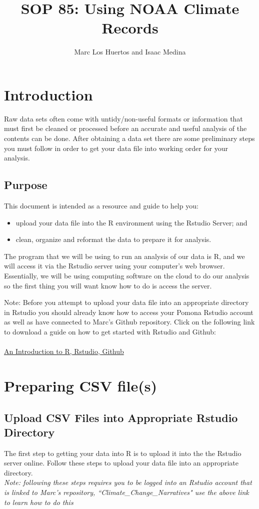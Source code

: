 \documentclass{article}\usepackage[]{graphicx}\usepackage[]{color}
\title{SOP 85: Using NOAA Climate Records}
\author{Marc Los Huertos and Isaac Medina}
\begin{document}
\maketitle

\section{Introduction}
Raw data sets often come with untidy/non-useful formats or information that must first be cleaned or processed before an accurate and useful analysis of the contents can be done. After obtaining a data set there are some preliminary steps you must follow in order to get your data file into working order for your analysis. 

\subsection{Purpose}
This document is intended as a resource and guide to help you: 
\begin{itemize}
\item upload your data file into the R environment using the Rstudio Server; and 
\item clean, organize and reformat the data to prepare it for analysis. 
\end{itemize}

The program that we will be using to run an analysis of our data is R, and we will access it via the Rstudio server using your computer's web browser. Essentially, we will be using computing software on the cloud to do our analysis so the first thing you will want know how to do is access the server. 

Note: Before you attempt to upload your data file into an appropriate directory in Rstudio you should already know how to access your Pomona Rstudio account as well as have connected to Marc's Github repository. Click on the following link to download a guide on how to get started with Rstudio and Github: \\
\\
\href{https://github.com/marclos/SOPs/raw/master/06_Rstudio_Github/Rstudio-and-Github_v03.pdf}{An Introduction to R, Rstudio, Github}

\section{Preparing CSV file(s)}



\subsection{Upload CSV Files into Appropriate Rstudio Directory} 
The first step to getting your data into R is to upload it into the the Rstudio server online. Follow these steps to upload your data file into an appropriate directory.\\ \emph{Note: following these steps requires you to be logged into an Rstudio account that is linked to Marc's repository, ``Climate\_Change\_Narratives" use the above link to learn how to do this}
\end{document}
